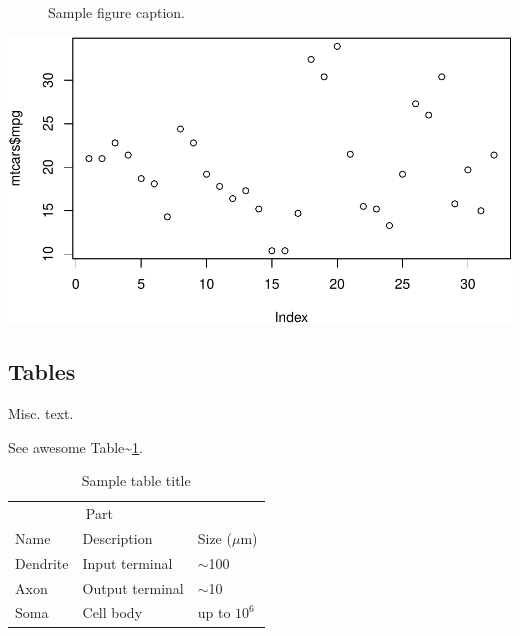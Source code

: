 \documentclass{article}
\newenvironment{Shaded}{\begin{snugshade}}{\end{snugshade}}
\newcommand{\KeywordTok}[1]{\textcolor[rgb]{0.13,0.29,0.53}{\textbf{#1}}}
\newcommand{\NormalTok}[1]{#1}
\newcommand{\OperatorTok}[1]{\textcolor[rgb]{0.81,0.36,0.00}{\textbf{#1}}}
\begin{document}
\begin{figure}
  \centering
  \fbox{\rule[-.5cm]{4cm}{4cm} \rule[-.5cm]{4cm}{0cm}}
  \caption{Sample figure caption.}
  \label{fig:fig1}
\end{figure}

\begin{Shaded}
\end{Shaded}

\includegraphics{Moroney_FinalReport_files/figure-latex/unnamed-chunk-1-1.pdf}

\hypertarget{tables}{%
\subsection{Tables}\label{tables}}

Misc. text.

See awesome Table\textasciitilde{}\ref{tab:table}.

\begin{table}
 \caption{Sample table title}
  \centering
  \begin{tabular}{lll}
    \toprule
    \multicolumn{2}{c}{Part}                   \\
    \cmidrule(r){1-2}
    Name     & Description     & Size ($\mu$m) \\
    \midrule
    Dendrite & Input terminal  & $\sim$100     \\
    Axon     & Output terminal & $\sim$10      \\
    Soma     & Cell body       & up to $10^6$  \\
    \bottomrule
  \end{tabular}
  \label{tab:table}
\end{table}
\end{document}
